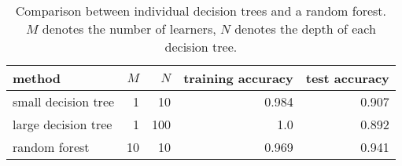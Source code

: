 \begin{table}[htbp]
    \centering
    \begin{tabular}{lrrrr}
    \toprule
    method & $M$ & $N$ & training accuracy & test accuracy \\
    \midrule
    small decision tree     & 1 & 10    & 0.984  & 0.907 \\
    large decision tree     & 1 & 100   & 1.0  & 0.892 \\
    random forest  & 10 & 10  & 0.969  & 0.941 \\
    \bottomrule
    \end{tabular}
    \caption{Comparison between individual decision trees and a random forest.\\$M$ denotes the number of learners, $N$ denotes the depth of each decision tree.}
    \label{tab:random_forest}
\end{table}